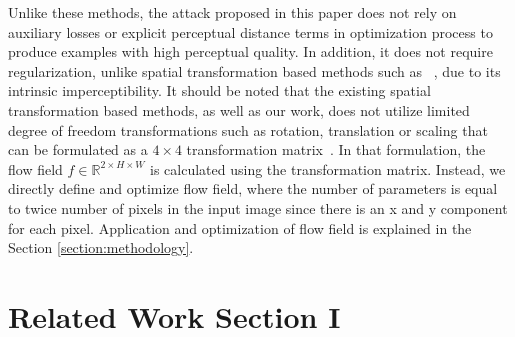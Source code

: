 Unlike these methods, the attack proposed in this paper does not rely on auxiliary losses or explicit perceptual distance terms in optimization process to produce examples with high perceptual quality. In addition, it does not require regularization, unlike spatial transformation based methods such as ~\cite{xiao2018spatially}, due to its intrinsic imperceptibility. It should be noted that the existing spatial transformation based methods, as well as our work, does not utilize limited degree of freedom transformations such as rotation, translation or scaling that can be formulated as a \(4\times4\) transformation matrix~\cite{jaderberg2015spatial}. In that formulation, the flow field \(f \in \mathbb{R}^{2\times H \times W}\) is calculated using the transformation matrix. Instead, we directly define and optimize flow field, where the number of parameters is equal to twice number of pixels in the input image since there is an x and y component for each pixel. Application and optimization of flow field is explained in the Section \ref{section:methodology}.

\section{Related Work Section I}
\label{Section2.1}


